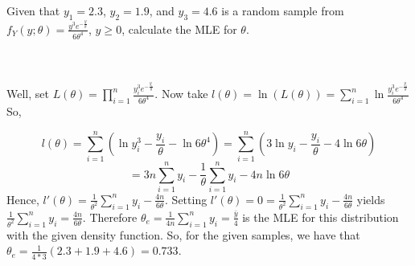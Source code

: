 Given that $y_1=2.3$, $y_2=1.9$, and $y_3=4.6$ is a random sample from
$f_Y(y;\theta)=\frac{y^3e^{-\frac{y}{\theta}}}{6\theta^4}$, $y\geq0$, calculate the MLE for
$\theta$.\\\\

\begin{solution}\renewcommand{\qedsymbol}{}\ \\
    Well, set $L(\theta)=\prod_{i=1}^n\frac{y_i^3e^{-\frac{y_i}{\theta}}}{6\theta^4}$. Now take
    $l(\theta)=\ln (L(\theta))=\sum_{i=1}^n\ln\frac{y_i^3e^{-\frac{y_i}{\theta}}}{6\theta^4}$ So,

    $$l(\theta)=\sum_{i=1}^n(\ln y_i^3-\frac{y_i}{\theta}-\ln6\theta^4)=
    \sum_{i=1}^n(3\ln y_i-\frac{y_i}{\theta}-4\ln6\theta)$$
    $$=3n\sum_{i=1}^ny_i-\frac{1}{\theta}\sum_{i=1}^ny_i-4n\ln6\theta$$
    Hence, $l'(\theta)=\frac{1}{\theta^2}\sum_{i=1}^ny_i-\frac{4n}{6\theta}$. Setting
    $l'(\theta)=0=\frac{1}{\theta^2}\sum_{i=1}^ny_i-\frac{4n}{6\theta}$ yields
    $\frac{1}{\theta^2}\sum_{i=1}^ny_i=\frac{4n}{6\theta}$. Therefore
    $\theta_e=\frac{1}{4n}\sum_{i=1}^ny_i=\frac{\bar{y}}{4}$ is the MLE for this distribution with the
    given density function. So, for the given samples, we have that
    $\theta_e=\frac{1}{4*3}(2.3+1.9+4.6)=0.733$.

\end{solution}